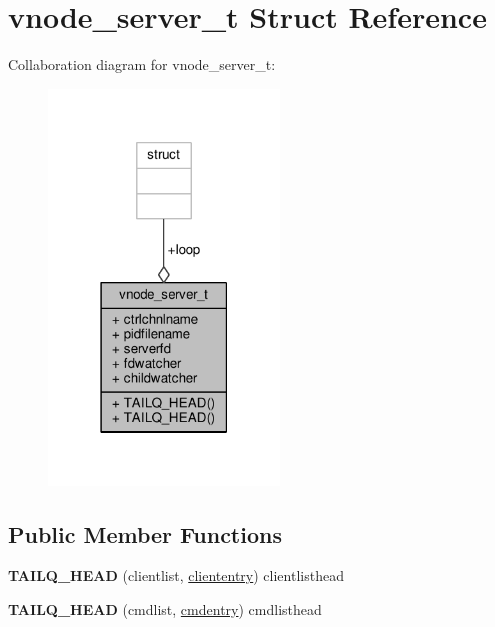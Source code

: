 \hypertarget{structvnode__server__t}{\section{vnode\+\_\+server\+\_\+t Struct Reference}
\label{structvnode__server__t}
}


Collaboration diagram for vnode\+\_\+server\+\_\+t\+:
\nopagebreak
\begin{figure}[H]
\begin{center}
\leavevmode
\includegraphics[width=174pt]{structvnode__server__t__coll__graph}
\end{center}
\end{figure}
\subsection*{Public Member Functions}
\begin{DoxyCompactItemize}
\item 
\hypertarget{structvnode__server__t_ae0b72421197571751cd6717ea40f0b69}{{\bfseries T\+A\+I\+L\+Q\+\_\+\+H\+E\+A\+D} (clientlist, \hyperlink{structcliententry}{cliententry}) clientlisthead}\label{structvnode__server__t_ae0b72421197571751cd6717ea40f0b69}

\item 
\hypertarget{structvnode__server__t_afe5b89583a7f38d3354f51bc8e3fcf5a}{{\bfseries T\+A\+I\+L\+Q\+\_\+\+H\+E\+A\+D} (cmdlist, \hyperlink{structcmdentry}{cmdentry}) cmdlisthead}\label{structvnode__server__t_afe5b89583a7f38d3354f51bc8e3fcf5a}

\end{DoxyCompactItemize}

